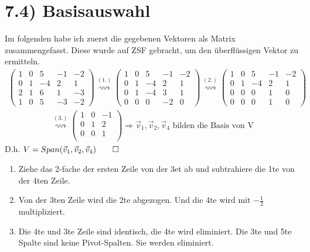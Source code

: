 \documentclass[titlepage]{article}
\newcommand{\1}{\mathbb{1}}
\newcommand{\0}{\mathbb{0}}
\begin{document}
	\section*{7.4) Basisauswahl}
		Im folgenden habe ich zuerst die gegebenen Vektoren als Matrix zusammengefasst. Diese wurde auf ZSF gebracht, um den überflüssigen Vektor zu ermitteln.
		\begin{align*}
			\begin{pmatrix}
				1&0&5&-1&-2\\
				0&1&-4&2&1\\
				2&1&6&1&-3\\
				1&0&5&-3&-2
			\end{pmatrix}
			\overset{(1.)}{\rightsquigarrow}
			\begin{pmatrix}
				1&0&5&-1&-2\\
				0&1&-4&2&1\\
				0&1&-4&3&1\\
				0&0&0&-2&0
			\end{pmatrix}
			\overset{(2.)}{\rightsquigarrow}
			\begin{pmatrix}
				1&0&5&-1&-2\\
				0&1&-4&2&1\\
				0&0&0&1&0\\
				0&0&0&1&0
			\end{pmatrix}
		\end{align*}
		\begin{align*}
			\overset{(3.)}{\rightsquigarrow}
			\begin{pmatrix}
				1&0&-1\\
				0&1&2\\
				0&0&1\\
			\end{pmatrix}
			\Rightarrow
			\vec{v}_1,\vec{v}_2,\vec{v}_4\text{ bilden die Basis von V}
		\end{align*}
		D.h. $V=Span(\vec{v}_1,\vec{v}_2,\vec{v}_4)\qed$
		\begin{enumerate}
			\item Ziehe das 2-fache der ersten Zeile von der 3et ab und subtrahiere die 1te von der 4ten Zeile.
			\item Von der 3ten Zeile wird die 2te abgezogen. Und die 4te wird mit $-\frac{1}{2}$ multipliziert.
			\item Die 4te und 3te Zeile sind identisch, die 4te wird eliminiert. Die 3te und 5te Spalte sind keine Pivot-Spalten. Sie werden eliminiert.
		\end{enumerate}
\end{document}
